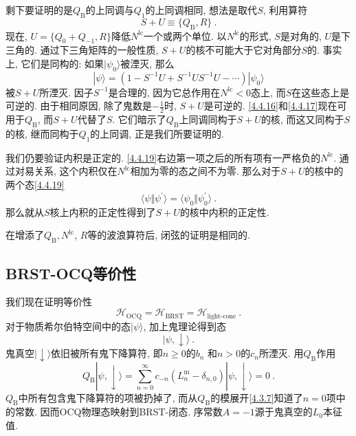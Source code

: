 剩下要证明的是$Q_{\mathrm{B}}$的上同调与$Q_{1}$的上同调相同, 想法是取代$S$, 利用算符
\begin{equation}
S+U \equiv\{Q_{\mathrm{B}}, R\} \:. \label{4.4.18}
\end{equation}
现在, $U=\{Q_{0}+Q_{-1}, R\}$降低$N^{\mathrm{lc}}$一个或两个单位. 以$N^{\mathrm{lc}}$的形式, $S$是对角的, $U$是下三角的. 
通过下三角矩阵的一般性质, $S+U$的核不可能大于它对角部分$S$的. 事实上, 它们是同构的: 如果$|\psi_{0}\rangle$被湮灭, 那么
\begin{equation}
|\psi\rangle=(1-S^{-1} U+S^{-1} U S^{-1} U-\cdots) |\psi_{0}\rangle \label{4.4.19}
\end{equation}
被$S+U$所湮灭. 因子$S^{-1}$是合理的, 因为它总作用在$N^{\mathrm{lc}}<0$态上, 而$S$在这些态上是可逆的. 由于相同原因, 除了鬼数是$-\frac{1}{2}$时, $S+U$是可逆的. 
\eqref{4.4.16}和\eqref{4.4.17}现在可用于$Q_{\mathrm{B}}$, 而$S+U$代替了$S$. 它们暗示了$Q_{\mathrm{B}}$上同调同构于$S+U$的核, 而这又同构于$S$的核, 
继而同构于$Q_{1}$的上同调, 正是我们所要证明的.

我们仍要验证内积是正定的. \eqref{4.4.19}右边第一项之后的所有项有一严格负的$N^{\mathrm{lc}}$. 通过对易关系, 这个内积仅在$N^{\mathrm{lc}}$相加为零的态之间不为零. 
那么对于$S+U$的核中的两个态\eqref{4.4.19}
\begin{equation}
\langle\psi \Vert \psi^{\prime}\rangle=\langle\psi_{0} \Vert \psi_{0}^{\prime}\rangle \:. \label{4.4.20}
\end{equation}
那么就从$S$核上内积的正定性得到了$S+U$的核中内积的正定性.

在增添了$Q_{\mathrm{B}}, N^{\mathrm{lc}}$, $R$等的波浪算符后, 闭弦的证明是相同的.

\subsection*{BRST-OCQ等价性}
我们现在证明等价性
\begin{equation}
\mathscr{H}_{\mathrm{OCQ}}=\mathscr{H}_{\mathrm{BRST}}=\mathscr{H}_{\text {light-cone}} \:. \label{4.4.21}
\end{equation}
对于物质希尔伯特空间中的态$\lvert\psi\rangle$, 加上鬼理论得到态
\begin{equation}
|\psi, \downarrow\rangle \:.\label{4.4.22}
\end{equation}
鬼真空$\lvert\downarrow\rangle$依旧被所有鬼下降算符, 即$n\geq 0$的$b_{n}$ 和$n>0 $的$c_{n}$所湮灭. 用$Q_{\mathrm{B}}$作用
\begin{equation}
Q_{\mathrm{B}}|\psi, \downarrow\rangle=\sum_{n=0}^{\infty} c_{-n}(L_{n}^{\mathrm{m}}-\delta_{n, 0})|\psi, \downarrow\rangle=0 \:. \label{4.4.23}
\end{equation}
$Q_{\mathrm{B}}$中所有包含鬼下降算符的项被扔掉了, 而从$Q_{\mathrm{B}}$的模展开\eqref{4.3.7}知道了$n=0$项中的常数. 因而OCQ物理态映射到BRST-闭态. 
序常数$A=-1$源于鬼真空的$L_{0}$本征值.

